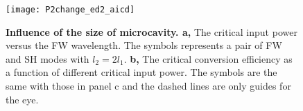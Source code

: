 \begin{figure}
\texttt{[image: P2change\_ed2\_aicd]}
\centering
\caption{\textbf{Influence of the size of microcavity. a,} The critical input power versus the FW wavelength. The symbols represents a pair of FW and SH modes with $l_2=2l_1$.  \textbf{b, }The critical conversion efficiency as a function of different critical input power. The symbols are the same with those in panel c and the dashed lines are only guides for the eye. }
\label{pic:P2change_ed2_aicd}
\end{figure}